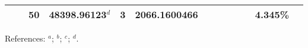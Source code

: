\begin{table*}
\begin{center}
{\begin{tabular}{:l;l;c;l;c;l;c;l;l;c;c;c;c}
\rowstyle{\itshape}               &        & 50        & 48398.96123$^{d}$                & 3 &  2066.1600466      &      & $                                        $ & $                                        $ & $      $ &              & 4.345\%   & $          $\\
\hline
\end{tabular}
}
{\footnotesize References:
$^{a}$\citet{Aldenius:2009:014008};
$^{b}$\citet{Pickering:2000:163};
$^{c}$\citet{Nave:2012:1570};
$^{d}$\citet{Berengut:2011:052520}.}
\end{center}
\end{table*}
